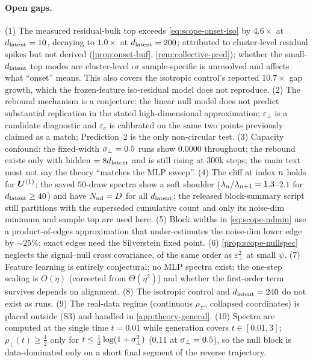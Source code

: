 \paragraph{Open gaps.}
(1) The measured residual-bulk top exceeds \eqref{eq:scope-onset-iso} by $4.6\times$ at $d_{\mathrm{latent}}=10$, decaying to $1.0\times$ at $d_{\mathrm{latent}}=200$; attributed to cluster-level residual spikes but not derived (\cref{prop:onset-buf}, \cref{rem:collective-pred}); whether the small-$d_{\mathrm{latent}}$ top modes are cluster-level or sample-specific is unresolved and affects what ``onset'' means. This also covers the isotropic control's reported $10.7\times$ gap growth, which the frozen-feature iso-residual model does not reproduce. (2) The rebound mechanism is a conjecture: the linear null model does not predict substantial replication in the stated high-dimensional approximation; $\varepsilon_\perp$ is a candidate diagnostic and $\varepsilon_c$ is calibrated on the same two points previously claimed as a match; Prediction~2 is the only non-circular test. (3) Capacity confound: the fixed-width $\sigma_{\perp}=0.5$ runs show $0.0000$ throughout; the rebound exists only with hidden $=8d_{\mathrm{latent}}$ and is still rising at $300$k steps; the main text must not say the theory ``matches the MLP sweep''. (4) The cliff at index $n$ holds for $\bm{U}^{(1)}$; the saved $50$-draw spectra show a soft shoulder ($\lambda_n/\lambda_{n+1}=1.3$--$2.1$ for $d_{\mathrm{latent}}\ge40$) and have $N_{\rm nd}=D$ for all $d_{\mathrm{latent}}$; the released block-summary script still partitions with the superseded cumulative count and only its noise-dim minimum and sample top are used here. (5) Block widths in \eqref{eq:scope-ndmin} use a product-of-edges approximation that under-estimates the noise-dim lower edge by $\sim25\%$; exact edges need the Silverstein fixed point. (6) \cref{prop:scope-nullspec} neglects the signal--null cross covariance, of the same order as $\varepsilon_\perp^2$ at small $\psi$. (7) Feature learning is entirely conjectural; no MLP spectra exist; the one-step scaling is $O(\eta)$ (corrected from $\Theta(\eta^2)$) and whether the first-order term survives depends on alignment. (8) The isotropic control and $d_{\mathrm{latent}}=240$ do not exist as runs. (9) The real-data regime (continuous $\rho_\Sigma$, collapsed coordinates) is placed outside (S3) and handled in \cref{app:theory-general}. (10) Spectra are computed at the single time $t=0.01$ while generation covers $t\in[0.01,3]$; $\rho_\perp(t)\ge\tfrac12$ only for $t\le\tfrac12\log(1+\sigma_{\perp}^2)$ ($0.11$ at $\sigma_{\perp}=0.5$), so the null block is data-dominated only on a short final segment of the reverse trajectory.

